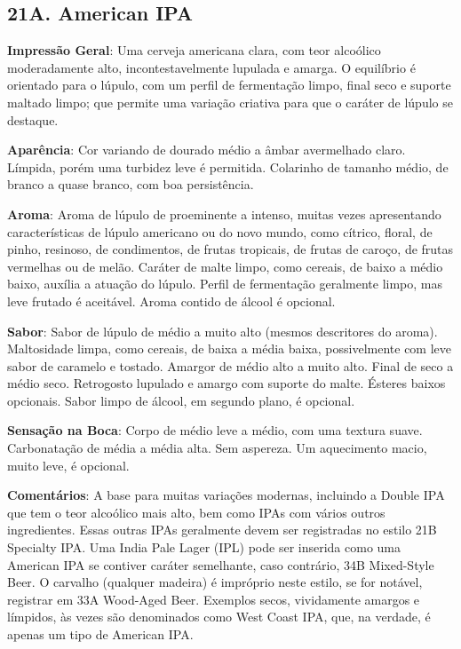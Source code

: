 \subsection*{21A. American IPA}
\textbf{Impressão Geral}: Uma cerveja americana clara, com teor alcoólico moderadamente alto, incontestavelmente lupulada e amarga. O equilíbrio é orientado para o lúpulo, com um perfil de fermentação limpo, final seco e suporte maltado limpo; que permite uma variação criativa para que o caráter de lúpulo se destaque.

\textbf{Aparência}: Cor variando de dourado médio a âmbar avermelhado claro. Límpida, porém uma turbidez leve é permitida. Colarinho de tamanho médio, de branco a quase branco, com boa persistência.

\textbf{Aroma}: Aroma de lúpulo de proeminente a intenso, muitas vezes apresentando características de lúpulo americano ou do novo mundo, como cítrico, floral, de pinho, resinoso, de condimentos, de frutas tropicais, de frutas de caroço, de frutas vermelhas ou de melão. Caráter de malte limpo, como cereais, de baixo a médio baixo, auxília a atuação do lúpulo. Perfil de fermentação geralmente limpo, mas leve frutado é aceitável. Aroma contido de álcool é opcional.

\textbf{Sabor}: Sabor de lúpulo de médio a muito alto (mesmos descritores do aroma). Maltosidade limpa, como cereais, de baixa a média baixa, possivelmente com leve sabor de caramelo e tostado. Amargor de médio alto a muito alto. Final de seco a médio seco. Retrogosto lupulado e amargo com suporte do malte. Ésteres baixos opcionais. Sabor limpo de álcool, em segundo plano, é opcional.

\textbf{Sensação na Boca}: Corpo de médio leve a médio, com uma textura suave. Carbonatação de média a média alta. Sem aspereza. Um aquecimento macio, muito leve, é opcional.

\textbf{Comentários}: A base para muitas variações modernas, incluindo a Double IPA que tem o teor alcoólico mais alto, bem como IPAs com vários outros ingredientes. Essas outras IPAs geralmente devem ser registradas no estilo 21B Specialty IPA. Uma India Pale Lager (IPL) pode ser inserida como uma American IPA se contiver caráter semelhante, caso contrário, 34B Mixed-Style Beer. O carvalho (qualquer madeira) é impróprio neste estilo, se for notável, registrar em 33A Wood-Aged Beer. Exemplos secos, vividamente amargos e límpidos, às vezes são denominados como West Coast IPA, que, na verdade, é apenas um tipo de American IPA.

